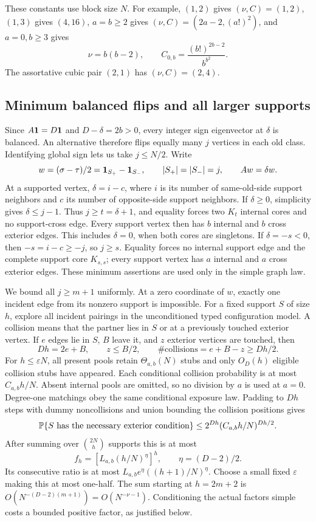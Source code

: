 These constants use block size $N$. For example, $(1,2)$ gives
$(\nu,C)=(1,2)$, $(1,3)$ gives $(4,16)$, $a=b\ge2$ gives
$(\nu,C)=(2a-2,(a!)^2)$, and $a=0,b\ge3$ gives
\[
 \nu=b(b-2),\qquad C_{0,b}=\frac{(b!)^{2b-2}}{b^{b^2}}.
\]
The assortative cubic pair $(2,1)$ has $(\nu,C)=(2,4)$.

\subsection{Minimum balanced flips and all larger supports}
Since $A\mathbf 1=D\mathbf 1$ and $D-\delta=2b>0$, every integer sign
eigenvector at $\delta$ is balanced. An alternative therefore flips
equally many $j$ vertices in each old class. Identifying global sign
lets us take $j\le N/2$. Write
\[
 w=(\sigma-\tau)/2=\mathbf 1_{S_+}-\mathbf 1_{S_-},\qquad
 |S_+|=|S_-|=j,\qquad Aw=\delta w.
\]
At a supported vertex, $\delta=i-c$, where $i$ is its number of
same-old-side support neighbors and $c$ its number of opposite-side
support neighbors. If $\delta\ge0$, simplicity gives
$\delta\le j-1$. Thus $j\ge t=\delta+1$, and equality forces two
$K_t$ internal cores and no support-cross edge. Every support vertex
then has $b$ internal and $b$ cross exterior edges. This includes
$\delta=0$, when both cores are singletons. If $\delta=-s<0$,
then $-s=i-c\ge-j$, so $j\ge s$. Equality forces no internal
support edge and the complete support core $K_{s,s}$; every support
vertex has $a$ internal and $a$ cross exterior edges.
These minimum assertions are used only in the simple graph law.

We bound all $j\ge m+1$ uniformly. At a zero coordinate of $w$,
exactly one incident edge from its nonzero support is impossible.
For a fixed support $S$ of size $h$, explore all incident pairings
in the unconditioned typed configuration model. A collision means
that the partner lies in $S$ or at a previously touched exterior
vertex. If $e$ edges lie in $S$, $B$ leave it, and $z$ exterior
vertices are touched, then
\[
 Dh=2e+B,\qquad z\le B/2,\qquad
 \#\text{collisions}=e+B-z\ge Dh/2.
\]
For $h\le\varepsilon N$, all present pools retain $\Theta_{a,b}(N)$
stubs and only $O_D(h)$ eligible collision stubs have appeared.
Each conditional collision probability is at most $C_{a,b}h/N$.
Absent internal pools are omitted, so no division by $a$ is used at
$a=0$. Degree-one matchings obey the same conditional exposure law.
Padding to $Dh$ steps with dummy noncollisions and union bounding
the collision positions gives
\[
 \mathbb P\{S\text{ has the necessary exterior condition}\}
 \le2^{Dh}(C_{a,b}h/N)^{Dh/2}.
\]
After summing over $\binom{2N}{h}$ supports this is at most
\begin{equation}\label{ap:eq:support}
 f_h=\left[L_{a,b}(h/N)^\eta\right]^h,
 \qquad \eta=(D-2)/2.
\end{equation}
Its consecutive ratio is at most
$L_{a,b}e^\eta((h+1)/N)^\eta$. Choose a small fixed
$\varepsilon$ making this at most one-half. The sum starting at
$h=2m+2$ is $O(N^{-(D-2)(m+1)})=O(N^{-\nu-1})$.
Conditioning the actual factors simple costs a bounded positive
factor, as justified below.


